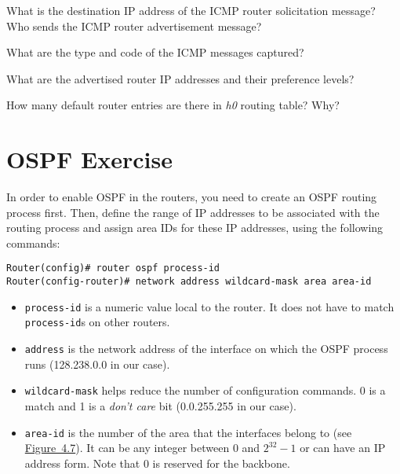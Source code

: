 \documentclass{../UTNetLab}
\begin{document}
    \begin{report}
        \item What is the destination IP address of the ICMP router solicitation message? Who sends the ICMP router advertisement message?
        \item What are the type and code of the ICMP messages captured?
        \item What are the advertised router IP addresses and their preference levels?
        \item How many default router entries are there in \textit{h0} routing table? Why?
    \end{report}

\part{OSPF Exercise}\label{sec:ospf}
    In order to enable OSPF in the routers, you need to create an OSPF routing process first.
    Then, define the range of IP addresses to be associated with the routing process and assign area IDs for these IP addresses, using the following commands:
    \begin{lstlisting}[language={cisco}, emph={process-id, area-id, address, wildcard-mask}]
Router(config)# router ospf process-id
Router(config-router)# network address wildcard-mask area area-id
    \end{lstlisting}
    
    \begin{itemize}
        \item \lstinline{process-id} is a numeric value local to the router.
    It does not have to match \lstinline{process-id}s on other routers.

    \item \lstinline{address} is the network address of the interface on which the OSPF process runs (128.238.0.0 in our case).

    \item \lstinline{wildcard-mask} helps reduce the number of configuration commands.
    0 is a match and 1 is a \textit{don’t care} bit (0.0.255.255 in our case).
    
    \item \lstinline{area-id} is the number of the area that the interfaces belong to (see \hyperref[fig:4.7]{Figure~4.7}).
    It can be any integer between 0 and $2^{32} - 1$ or can have an IP address form.
    Note that 0 is reserved for the backbone.
\end{itemize}
 
\end{document}
